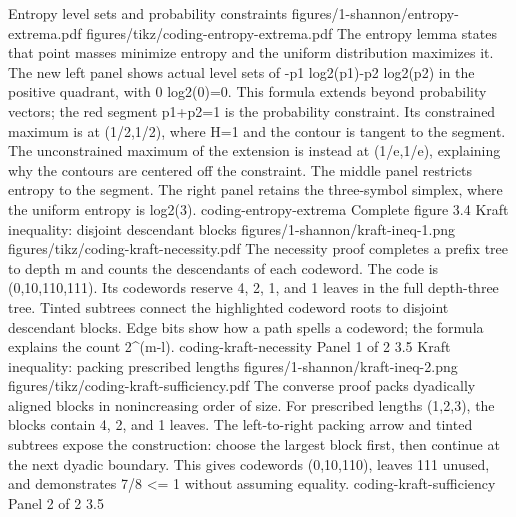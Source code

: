 {Entropy level sets and probability constraints}
{figures/1-shannon/entropy-extrema.pdf}
{figures/tikz/coding-entropy-extrema.pdf}
{The entropy lemma states that point masses minimize entropy and the uniform distribution maximizes it.}
{The new left panel shows actual level sets of -p1 log2(p1)-p2 log2(p2) in the positive quadrant, with 0 log2(0)=0. This formula extends beyond probability vectors; the red segment p1+p2=1 is the probability constraint. Its constrained maximum is at (1/2,1/2), where H=1 and the contour is tangent to the segment. The unconstrained maximum of the extension is instead at (1/e,1/e), explaining why the contours are centered off the constraint. The middle panel restricts entropy to the segment. The right panel retains the three-symbol simplex, where the uniform entropy is log2(3).}
{coding-entropy-extrema}
{Complete figure}
{3.4}
{Kraft inequality: disjoint descendant blocks}
{figures/1-shannon/kraft-ineq-1.png}
{figures/tikz/coding-kraft-necessity.pdf}
{The necessity proof completes a prefix tree to depth m and counts the descendants of each codeword.}
{The code is (0,10,110,111). Its codewords reserve 4, 2, 1, and 1 leaves in the full depth-three tree. Tinted subtrees connect the highlighted codeword roots to disjoint descendant blocks. Edge bits show how a path spells a codeword; the formula explains the count 2\textasciicircum{}(m-l).}
{coding-kraft-necessity}
{Panel 1 of 2}
{3.5}
{Kraft inequality: packing prescribed lengths}
{figures/1-shannon/kraft-ineq-2.png}
{figures/tikz/coding-kraft-sufficiency.pdf}
{The converse proof packs dyadically aligned blocks in nonincreasing order of size.}
{For prescribed lengths (1,2,3), the blocks contain 4, 2, and 1 leaves. The left-to-right packing arrow and tinted subtrees expose the construction: choose the largest block first, then continue at the next dyadic boundary. This gives codewords (0,10,110), leaves 111 unused, and demonstrates 7/8 <= 1 without assuming equality.}
{coding-kraft-sufficiency}
{Panel 2 of 2}
{3.5}
